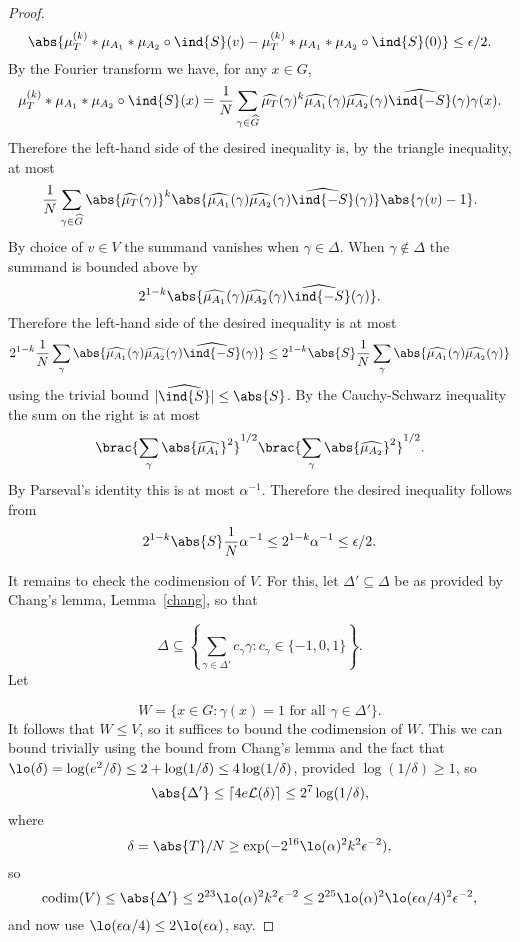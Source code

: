 \begin{proof}
\[\abs{\mu_T^{(k)}\ast \mu_{A_1}\ast \mu_{A_2}\circ \ind{S}(v)-\mu_T^{(k)}\ast\mu_{A_1}\ast \mu_{A_2}\circ \ind{S}(0)}\leq \epsilon/2.\]
By the Fourier transform we have, for any $x\in G$,
\[\mu_T^{(k)}\ast \mu_{A_1}\ast \mu_{A_2}\circ \ind{S}(x)=\frac{1}{N}\sum_{\gamma\in \widehat{G}}\widehat{\mu_T}(\gamma)^k\widehat{\mu_{A_1}}(\gamma)\widehat{\mu_{A_2}}(\gamma)\widehat{\ind{-S}}(\gamma)\gamma(x).\]
Therefore the left-hand side of the desired inequality is, by the triangle inequality, at most
\[\frac{1}{N}\sum_{\gamma\in \widehat{G}}\abs{\widehat{\mu_T}(\gamma)}^k\abs{\widehat{\mu_{A_1}}(\gamma)\widehat{\mu_{A_2}}(\gamma)\widehat{\ind{-S}}(\gamma)}\abs{\gamma(v)-1}.\]
By choice of $v\in V$ the summand vanishes when $\gamma\in\Delta$. When $\gamma\not\in \Delta$ the summand is bounded above by
\[2^{1-k}\abs{\widehat{\mu_{A_1}}(\gamma)\widehat{\mu_{A_2}}(\gamma)\widehat{\ind{-S}}(\gamma)}.\]
Therefore the left-hand side of the desired inequality is at most
\[2^{1-k}\frac{1}{N}\sum_{\gamma}\abs{\widehat{\mu_{A_1}}(\gamma)\widehat{\mu_{A_2}}(\gamma)\widehat{\ind{-S}}(\gamma)}\leq 2^{1-k}\abs{S}\frac{1}{N}\sum_{\gamma}\abs{\widehat{\mu_{A_1}}(\gamma)\widehat{\mu_{A_2}}(\gamma)}\]
using the trivial bound $\lvert\widehat{\ind{S}}\rvert\leq \abs{S}$. By the Cauchy-Schwarz inequality the sum on the right is at most
\[\brac{\sum_\gamma \abs{\widehat{\mu_{A_1}}}^2}^{1/2}\brac{\sum_\gamma \abs{\widehat{\mu_{A_2}}}^2}^{1/2}.\]
By Parseval's identity this is at most $\alpha^{-1}$. Therefore the desired inequality follows from
\[2^{1-k}\abs{S}\frac{1}{N}\alpha^{-1}\leq 2^{1-k}\alpha^{-1}\leq \epsilon/2.\]

It remains to check the codimension of $V$. For this, let $\Delta'\subseteq \Delta$ be as provided by Chang's lemma, Lemma~\ref{chang}, so that

\[\Delta\subseteq \left\{ \sum_{\gamma\in\Delta'}c_\gamma \gamma : c_\gamma\in \{-1,0,1\} \right\}.\]
Let

\[W= \{ x \in G : \gamma(x)=1\textrm{ for all }\gamma\in\Delta'\}.\]
It follows that $W\leq V$, so it suffices to bound the codimension of $W$. This we can bound trivially using the bound from Chang's lemma and the fact that $\lo(\delta)=\log(e^2/\delta)\leq 2+\log(1/\delta)\leq 4\log(1/\delta)$, provided $\log(1/\delta)\geq 1$, so
\[\abs{\Delta'}\leq  \lceil 4e\mathcal{L}(\delta)\rceil\leq 2^7\log(1/\delta),\]
where
\[\delta=\abs{T}/N\geq \exp(-2^{16}\lo(\alpha)^2k^2\epsilon^{-2}),\]
so
\[\mathrm{codim}(V)\leq \abs{\Delta'}\leq 2^{23}\lo(\alpha)^2k^2\epsilon^{-2}\leq 2^{25}\lo(\alpha)^2\lo(\epsilon \alpha/4)^2\epsilon^{-2},\]
and now use $\lo(\epsilon\alpha/4)\leq 2\lo(\epsilon\alpha)$, say.
\end{proof}


